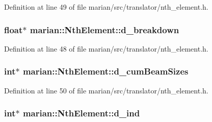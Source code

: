 Definition at line 49 of file marian/src/translator/nth\+\_\+element.\+h.

\subsubsection[{\texorpdfstring{d\+\_\+breakdown}{d_breakdown}}]{\setlength{\rightskip}{0pt plus 5cm}float$\ast$ marian\+::\+Nth\+Element\+::d\+\_\+breakdown\hspace{0.3cm}{\ttfamily [private]}}\hypertarget{classmarian_1_1NthElement_aa92fceb2668bbd60cd7a913c1df6a3ae}{}\label{classmarian_1_1NthElement_aa92fceb2668bbd60cd7a913c1df6a3ae}


Definition at line 48 of file marian/src/translator/nth\+\_\+element.\+h.

\subsubsection[{\texorpdfstring{d\+\_\+cum\+Beam\+Sizes}{d_cumBeamSizes}}]{\setlength{\rightskip}{0pt plus 5cm}int$\ast$ marian\+::\+Nth\+Element\+::d\+\_\+cum\+Beam\+Sizes\hspace{0.3cm}{\ttfamily [private]}}\hypertarget{classmarian_1_1NthElement_ad8715fa3b2b2b3de6a9949ac84de52df}{}\label{classmarian_1_1NthElement_ad8715fa3b2b2b3de6a9949ac84de52df}


Definition at line 50 of file marian/src/translator/nth\+\_\+element.\+h.

\subsubsection[{\texorpdfstring{d\+\_\+ind}{d_ind}}]{\setlength{\rightskip}{0pt plus 5cm}int$\ast$ marian\+::\+Nth\+Element\+::d\+\_\+ind\hspace{0.3cm}{\ttfamily [private]}}\hypertarget{classmarian_1_1NthElement_a2b139afaa92c3639701ff110b6a826c5}{}\label{classmarian_1_1NthElement_a2b139afaa92c3639701ff110b6a826c5}


